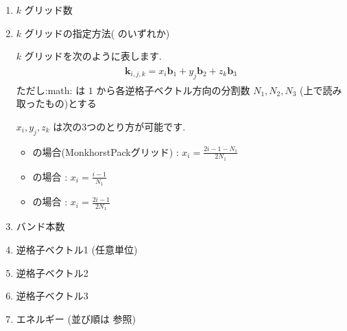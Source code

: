 \documentclass[letterpaper,10pt,dvipdfmx,openany]{sphinxmanual}
\begin{document}
\begin{enumerate}
%
\item {} 
\sphinxAtStartPar
\(k\) グリッド数

\item {} 
\sphinxAtStartPar
\(k\) グリッドの指定方法(  のいずれか)

\sphinxAtStartPar
\(k\) グリッドを次のように表します.
\begin{equation*}
\begin{split}\begin{align}
{\boldsymbol k}_{i,j,k} =
x_i {\boldsymbol b}_1 + y_j {\boldsymbol b}_2 + z_k {\boldsymbol b}_3
\end{align}\end{split}
\end{equation*}
\sphinxAtStartPar
ただし:math: は \(1\) から各逆格子ベクトル方向の分割数
\(N_1, N_2, N_3\) (上で読み取ったもの)とする

\sphinxAtStartPar
\(x_i, y_j,z_k\) は次の3つのとり方が可能です.
\begin{itemize}
\item {} 
\sphinxAtStartPar
{} の場合(Monkhorst\sphinxhyphen{}Packグリッド) :
\(x_i = \frac{2 i - 1 - N_1}{2 N_1}\)

\item {} 
\sphinxAtStartPar
{} の場合 : \(x_i = \frac{i - 1}{N_1}\)

\item {} 
\sphinxAtStartPar
{} の場合 : \(x_i = \frac{2 i - 1}{2 N_1}\)

\end{itemize}

\item {} 
\sphinxAtStartPar
バンド本数

\item {} 
\sphinxAtStartPar
逆格子ベクトル1 (任意単位)

\item {} 
\sphinxAtStartPar
逆格子ベクトル2

\item {} 
\sphinxAtStartPar
逆格子ベクトル3

\item {} 
\sphinxAtStartPar
エネルギー (並び順は {\hyperref[\detokenize{input:format}]{}} 参照)


\end{enumerate}
\end{document}
